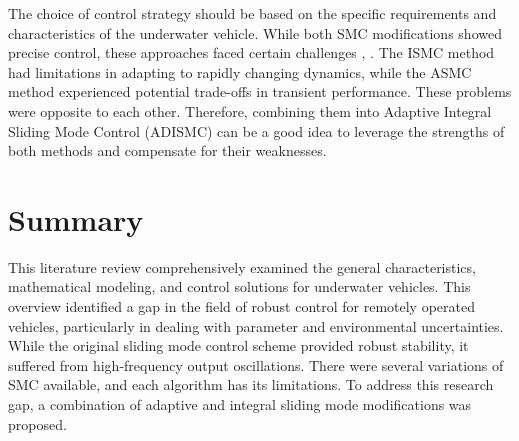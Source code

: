 The choice of control strategy should be based on the specific 
requirements and characteristics of the underwater vehicle. While both SMC modifications showed 
precise control, these approaches faced certain challenges \cite{integral_smc}, \cite{adaptive_smc}. The ISMC method had limitations in adapting to rapidly changing dynamics, while the ASMC method experienced potential trade-offs in transient performance. 
These problems were opposite to each other. Therefore, combining them into Adaptive Integral Sliding 
Mode Control (ADISMC) can be a good idea to leverage the strengths of both methods and compensate 
for their weaknesses.

\section{Summary}

This literature review comprehensively examined the general characteristics, mathematical modeling, 
and control solutions for underwater vehicles. This overview identified a gap in the field of robust 
control for remotely operated vehicles, particularly in dealing with parameter and environmental 
uncertainties. While the original sliding mode control scheme provided robust stability, it suffered 
from high-frequency output oscillations. There were several variations of SMC available, and each 
algorithm has its limitations. To address this research gap, a combination of adaptive and integral 
sliding mode modifications was proposed.